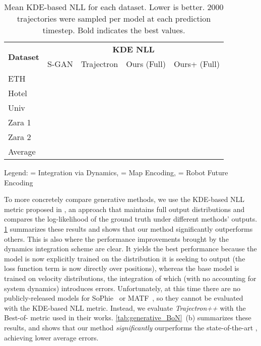 \documentclass[runningheads]{llncs}
\newcommand{\algname}{\mbox{Trajectron++}}
\newcommand{\emphalgname}{\emph{\algname}}
\newcommand\Tstrut{\rule{0pt}{2.6ex}}       \newcommand\Bstrut{\rule[-0.9ex]{0pt}{0pt}} \newcommand{\TBstrut}{\Tstrut\Bstrut}
\begin{document}
\begin{table}[t]
\fontsize{8}{8}\selectfont
\centering
\caption{Mean KDE-based NLL for each dataset. Lower is better. 2000 trajectories were sampled per model at each prediction timestep. Bold indicates the best values.}
\begin{tabular}{l|cc|cc}
\toprule
\multicolumn{1}{c|}{\multirow{2}{*}{\textbf{Dataset}}} & \multicolumn{4}{c}{\textbf{KDE NLL}} \\ \cline{2-5} 
\multicolumn{1}{c|}{}                         & S-GAN \cite{GuptaJohnsonEtAl2018}       & Trajectron \cite{IvanovicPavone2019}     & Ours (Full)  & Ours+ (Full) \Tstrut  \\ \midrule
ETH                                           &        &             &  &       \\ 
Hotel                                         &         &             &  &      \\ 
Univ                                          &         &             &  &       \\ 
Zara 1                                        &         &             &   &       \\ 
Zara 2                                        &         &             &  &       \\ \midrule
Average                                       &         &             &  &       \\ \bottomrule
\end{tabular}
\label{tab:kde_nll}

Legend:  = Integration via Dynamics,  = Map Encoding,  = Robot Future Encoding
\end{table}

To more concretely compare generative methods, we use the KDE-based NLL metric proposed in \cite{IvanovicPavone2019,ThiedeBrahma2019}, an approach that maintains full output distributions and compares the log-likelihood of the ground truth under different methods' outputs. \cref{tab:kde_nll} summarizes these results and shows that our method significantly outperforms others. This is also where the performance improvements brought by the dynamics integration scheme are clear. It yields the best performance because the model is now explicitly trained on the distribution it is seeking to output (the loss function term  is now directly over positions), whereas the base model is trained on velocity distributions, the integration of which (with no accounting for system dynamics) introduces errors.
Unfortunately, at this time there are no publicly-released models for SoPhie~\cite{SadeghianKosarajuEtAl2019} or MATF~\cite{ZhaoXuEtAl2019}, so they cannot be evaluated with the KDE-based NLL metric. Instead, we evaluate \emphalgname{} with the Best-of- metric used in their works.
\cref{tab:generative_BoN}~(b) summarizes these results, and shows that our method \textit{significantly} ourperforms the state-of-the-art \cite{ZhaoXuEtAl2019}, achieving  lower average errors.
\end{document}
